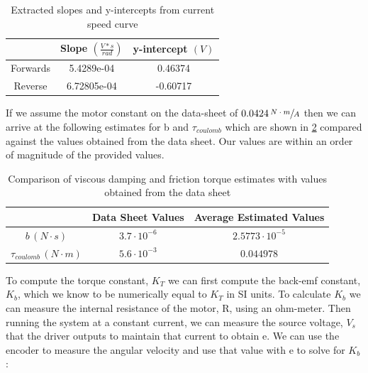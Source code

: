 \documentclass{article}
\theoremstyle{plain}
\theoremstyle{definition}
\theoremstyle{remark}
\begin{document}
\begin{table}[htb]
\begin{center}
    \begin{tabular}{|c|c|c|}
        \hline
        ~        & Slope $\left( \frac{V * s}{rad} \right) $ & y-intercept $ \left( V \right) $ \\ \hline
        Forwards & 5.4289e-04                                & 0.46374                          \\ 
        Reverse  & 6.72805e-04                               & -0.60717                         \\
        \hline
    \end{tabular}
\end{center}
\caption{Extracted slopes and y-intercepts from current speed curve}
\label{q2_b5}
\end{table}

If we assume the motor constant on the data-sheet of $0.0424 \, \sfrac{N \cdot m}{A}$ then we can arrive at the following estimates for b and $\tau_{coulomb}$ which are shown in \ref{q2_b10} compared against the values obtained from the data sheet.  Our values are within an order of magnitude of the provided values. \\

\begin{table}
\begin{center}
    \begin{tabular}{|c|c|c|}
        \hline
        ~                                                        & Data Sheet Values   & Average Estimated Values \\ \hline
        $b \, \left( N \cdot s \right) $             & $3.7 \cdot 10^{-6}$ & $2.5773 \cdot 10^{-5}$   \\ 
        $\tau_{coulomb} \, \left( N \cdot m \right)$ & $5.6 \cdot 10^{-3}$ & $0.044978$               \\
        \hline
    \end{tabular}
\end{center}
\caption{Comparison of viscous damping and friction torque estimates with values obtained from the data sheet}
\label{q2_b10}
\end{table}

To compute the torque constant, $K_{T}$ we can first compute the back-emf constant, $K_b$, which we know to be numerically equal to $K_T$ in SI units.  To calculate $K_b$ we can measure the internal resistance of the motor, R, using an ohm-meter.  Then running the system at a constant current, we can measure the source voltage, $V_{s}$ that the driver outputs to maintain that current  to obtain e. We can use the encoder to measure the angular velocity and use that value with e to solve for $K_b$:
\end{document}
